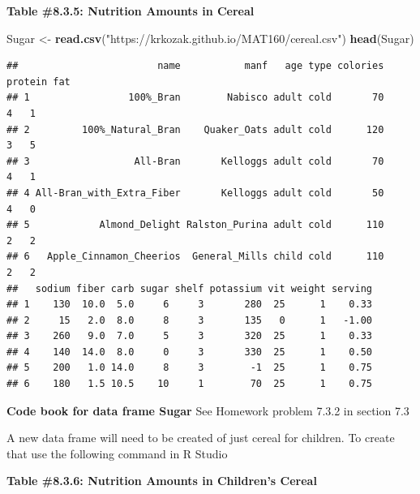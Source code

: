 \documentclass[
]{book}
\newenvironment{Shaded}{\begin{snugshade}}{\end{snugshade}}
\newcommand{\KeywordTok}[1]{\textcolor[rgb]{0.13,0.29,0.53}{\textbf{#1}}}
\newcommand{\NormalTok}[1]{#1}
\newcommand{\OperatorTok}[1]{\textcolor[rgb]{0.81,0.36,0.00}{\textbf{#1}}}
\newcommand{\StringTok}[1]{\textcolor[rgb]{0.31,0.60,0.02}{#1}}
\begin{document}
\textbf{Table \#8.3.5: Nutrition Amounts in Cereal}

\begin{Shaded}
\begin{Highlighting}[]
\NormalTok{Sugar <-}\StringTok{ }\KeywordTok{read.csv}\NormalTok{(}\StringTok{"https://krkozak.github.io/MAT160/cereal.csv"}\NormalTok{)}
\KeywordTok{head}\NormalTok{(Sugar)}
\end{Highlighting}
\end{Shaded}

\begin{verbatim}
##                        name           manf   age type colories protein fat
## 1                 100%_Bran        Nabisco adult cold       70       4   1
## 2         100%_Natural_Bran    Quaker_Oats adult cold      120       3   5
## 3                  All-Bran       Kelloggs adult cold       70       4   1
## 4 All-Bran_with_Extra_Fiber       Kelloggs adult cold       50       4   0
## 5            Almond_Delight Ralston_Purina adult cold      110       2   2
## 6   Apple_Cinnamon_Cheerios  General_Mills child cold      110       2   2
##   sodium fiber carb sugar shelf potassium vit weight serving
## 1    130  10.0  5.0     6     3       280  25      1    0.33
## 2     15   2.0  8.0     8     3       135   0      1   -1.00
## 3    260   9.0  7.0     5     3       320  25      1    0.33
## 4    140  14.0  8.0     0     3       330  25      1    0.50
## 5    200   1.0 14.0     8     3        -1  25      1    0.75
## 6    180   1.5 10.5    10     1        70  25      1    0.75
\end{verbatim}

\textbf{Code book for data frame Sugar} See Homework problem 7.3.2 in section 7.3

A new data frame will need to be created of just cereal for children. To create that use the following command in R Studio

\textbf{Table \#8.3.6: Nutrition Amounts in Children's Cereal}

\begin{Shaded}
\end{Shaded}
\end{document}
